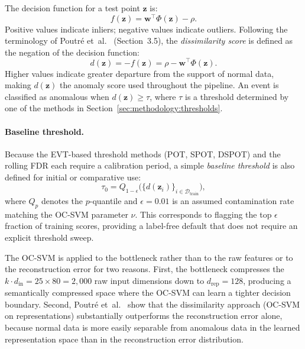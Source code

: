 \documentclass[11pt]{report}
\begin{document}
The decision function for a test point $\mathbf{z}$ is:
\begin{equation}
  \label{eq:ocsvm_decision}
  f(\mathbf{z}) = \mathbf{w}^\top \Phi(\mathbf{z}) - \rho.
\end{equation}
Positive values indicate inliers; negative values indicate outliers. Following the terminology of Poutr\'e et~al.~\cite{poutre_2024} (Section~3.5), the \emph{dissimilarity score} is defined as the negation of the decision function:
\begin{equation}
  \label{eq:dissimilarity}
  d(\mathbf{z}) = -f(\mathbf{z}) = \rho - \mathbf{w}^\top \Phi(\mathbf{z}).
\end{equation}
Higher values indicate greater departure from the support of normal data, making $d(\mathbf{z})$ the anomaly score used throughout the pipeline. An event is classified as anomalous when $d(\mathbf{z}) \geq \tau$, where $\tau$ is a threshold determined by one of the methods in Section~\ref{sec:methodology:thresholds}.

\paragraph{Baseline threshold.}
Because the EVT-based threshold methods (POT, SPOT, DSPOT) and the rolling FDR each require a calibration period, a simple \emph{baseline threshold} is also defined for initial or comparative use:
\begin{equation}
  \label{eq:baseline_tau}
  \tau_0 = Q_{1 - \epsilon}\!\bigl(\{d(\mathbf{z}_i)\}_{i \in \mathcal{D}_{\text{train}}}\bigr),
\end{equation}
where $Q_p$ denotes the $p$-quantile and $\epsilon = 0.01$ is an assumed contamination rate matching the OC-SVM parameter $\nu$. This corresponds to flagging the top $\epsilon$ fraction of training scores, providing a label-free default that does not require an explicit threshold sweep.

The OC-SVM is applied to the bottleneck rather than to the raw features or to the reconstruction error for two reasons. First, the bottleneck compresses the $k \cdot d_{\text{in}} = 25 \times 80 = 2{,}000$ raw input dimensions down to $d_{\text{rep}} = 128$, producing a semantically compressed space where the OC-SVM can learn a tighter decision boundary. Second, Poutr\'e et~al.~\cite{poutre_2024} show that the dissimilarity approach (OC-SVM on representations) substantially outperforms the reconstruction error alone, because normal data is more easily separable from anomalous data in the learned representation space than in the reconstruction error distribution.
\end{document}

